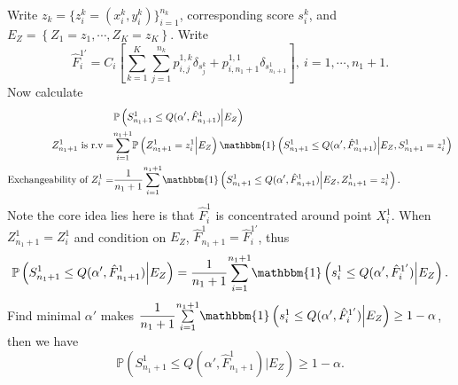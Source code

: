 \documentclass[12pt, a4paper, oneside]{article}
\begin{document}
    Write $z_k=\{z_i^k=(x_i^k,y_i^k)\}_{i=1}^{n_k}$, corresponding score $s_i^k$, and $E_Z=\left\{ Z_1=z_1,\cdots,Z_K=z_K \right\}$. Write
    \begin{equation*}
        \hat{F}_i^{1'}=C_i\left[ \overset{K}{\underset{k=1}\sum}\overset{n_k}{\underset{j=1}\sum}p_{i,j}^{1,k}\delta_{s_j^k}+p_{i,n_1+1}^{1,1}\delta_{s_{n_1+1}^1} \right],\ i=1,\cdots,n_1+1.
    \end{equation*}
    Now calculate
    \begin{align*}
        &\mathbb{P}\left( S_{n_1+1}^1\leq Q(\alpha',\hat{F}_{n_1+1}^1)\Big|E_Z \right)\\
        \text{$Z_{n_1+1}^1$ is r.v}=&\overset{n_1+1}{\underset{i=1}\sum}\mathbb{P}\left( Z_{n_1+1}^1=z_i^1\Big|E_Z \right)\mathbbm{1}\left( S_{n_1+1}^1\leq Q(\alpha',\hat{F}_{n_1+1}^1)\Big|E_Z,S_{n_1+1}^1=z_i^1 \right)\\
        \text{Exchangeability of $Z_i^1$}=&\dfrac{1}{n_1+1}\overset{n_1+1}{\underset{i=1}\sum}\mathbbm{1}\left( S_{n_1+1}^1\leq Q(\alpha',\hat{F}_{n_1+1}^1)\Big|E_Z,Z_{n_1+1}^1=z_i^1 \right).
    \end{align*}
    Note the core idea lies here is that $\hat{F}_i^1$ is concentrated around point $X_i^1$. When $Z_{n_1+1}^1=Z_i^1$ and condition on $E_Z$, $\hat{F}_{n_1+1}^1=\hat{F}_i^{1'}$, thus
    \begin{align*}
        \mathbb{P}\left( S_{n_1+1}^1\leq Q(\alpha',\hat{F}_{n_1+1}^1)\Big|E_Z \right)=\dfrac{1}{n_1+1}\overset{n_1+1}{\underset{i=1}\sum}\mathbbm{1}\left( s_i^1\leq Q(\alpha',\hat{F}_i^{1'})\Big|E_Z \right).
    \end{align*}
    Find minimal $\alpha'$ makes $\dfrac{1}{n_1+1}\overset{n_1+1}{\underset{i=1}\sum}\mathbbm{1}\left( s_i^1\leq Q(\alpha',\hat{F}_i^{1'})\Big|E_Z \right)\geq 1-\alpha$, then we have
    \begin{equation*}
        \mathbb{P}\left( S_{n_1+1}^1\leq Q(\alpha',\hat{F}_{n_1+1}^1)\Big|E_Z \right)\geq 1-\alpha.
    \end{equation*}
\end{document}
